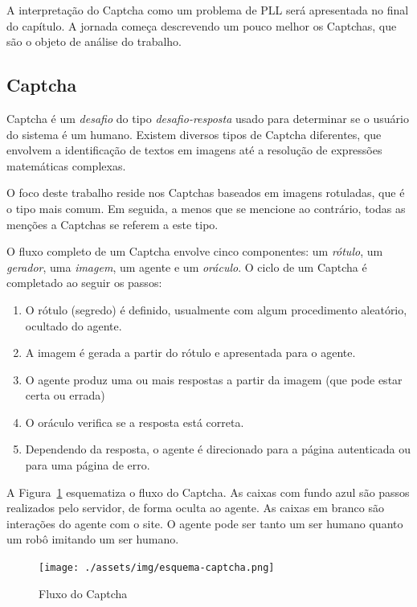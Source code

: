 \documentclass[12pt,twoside,brazilian]{book}
\providecommand{\tightlist}{%
  \setlength{\itemsep}{0pt}\setlength{\parskip}{0pt}}
\begin{document}
A interpretação do Captcha como um problema de PLL será apresentada no
final do capítulo. A jornada começa descrevendo um pouco melhor os
Captchas, que são o objeto de análise do trabalho.

\hypertarget{sec-definicao-captcha}{%
\subsection{Captcha}\label{sec-definicao-captcha}}

Captcha é um \emph{desafio} do tipo \emph{desafio-resposta} usado para
determinar se o usuário do sistema é um humano. Existem diversos tipos
de Captcha diferentes, que envolvem a identificação de textos em imagens
até a resolução de expressões matemáticas complexas.

O foco deste trabalho reside nos Captchas baseados em imagens rotuladas,
que é o tipo mais comum. Em seguida, a menos que se mencione ao
contrário, todas as menções a Captchas se referem a este tipo.

O fluxo completo de um Captcha envolve cinco componentes: um
\emph{rótulo}, um \emph{gerador}, uma \emph{imagem}, um agente e um
\emph{oráculo}. O ciclo de um Captcha é completado ao seguir os passos:

\begin{enumerate}
\def\labelenumi{\arabic{enumi}.}
\tightlist
\item
  O rótulo (segredo) é definido, usualmente com algum procedimento
  aleatório, ocultado do agente.
\item
  A imagem é gerada a partir do rótulo e apresentada para o agente.
\item
  O agente produz uma ou mais respostas a partir da imagem (que pode
  estar certa ou errada)
\item
  O oráculo verifica se a resposta está correta.
\item
  Dependendo da resposta, o agente é direcionado para a página
  autenticada ou para uma página de erro.
\end{enumerate}

A Figura~\ref{fig-esquema-captcha} esquematiza o fluxo do Captcha. As
caixas com fundo azul são passos realizados pelo servidor, de forma
oculta ao agente. As caixas em branco são interações do agente com o
site. O agente pode ser tanto um ser humano quanto um robô imitando um
ser humano.

\begin{figure}

{\centering \texttt{[image: ./assets/img/esquema-captcha.png]}

}

\caption{\label{fig-esquema-captcha}Fluxo do Captcha}

\end{figure}
\end{document}
